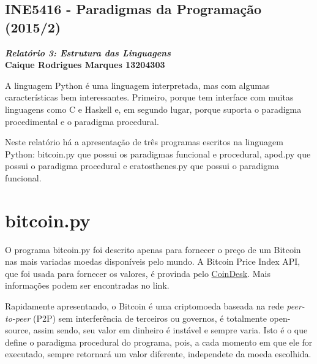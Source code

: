 \documentclass{article}
\begin{document}
\begin{center}
    \section*{INE5416 - Paradigmas da Programação (2015/2)}
    \textbf{\textit{Relatório 3: Estrutura das Linguagens} \\
    Caique Rodrigues Marques 13204303}
\end{center}

A linguagem Python é uma linguagem interpretada, mas com algumas características bem interessantes. Primeiro, porque tem interface com muitas linguagens como C e Haskell e, em segundo lugar, porque suporta o paradigma procedimental e o paradigma procedural.

Neste relatório há a apresentação de três programas escritos na linguagem Python: bitcoin.py que possui os paradigmas funcional e procedural, apod.py que possui o paradigma procedural e eratosthenes.py que possui o paradigma funcional.

\section*{bitcoin.py}
O programa bitcoin.py foi descrito apenas para fornecer o preço de um Bitcoin nas mais variadas moedas disponíveis pelo mundo. A Bitcoin Price Index API, que foi usada para fornecer os valores, é provinda pelo \href{http://www.coindesk.com/api/}{CoinDesk}. Mais informações podem ser encontradas no link.

Rapidamente apresentando, o Bitcoin é uma criptomoeda baseada na rede \textit{peer-to-peer} (P2P) sem interferência de terceiros ou governos, é totalmente open-source, assim sendo, seu valor em dinheiro é instável e sempre varia. Isto é o que define o paradigma procedural do programa, pois, a cada momento em que ele for executado, sempre retornará um valor diferente, independete da moeda escolhida.
\end{document}
